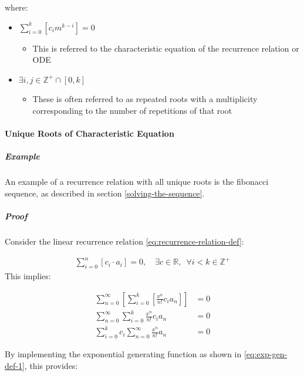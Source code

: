 \documentclass[11pt]{article}
\begin{document}
where:

\begin{itemize}
\item \(\sum^{k}_{i=0}\left[  c_{i}m^{k-i} \right] = 0\)
\begin{itemize}
\item This is referred to the characteristic equation of the recurrence relation or ODE \cite{levinSolvingRecurrenceRelations2018}
\end{itemize}
\item \(\exists i,j \in \mathbb{Z}^{+} \cap \left[0,k\right]\)
\begin{itemize}
\item These is often referred to as repeated roots \cite{levinSolvingRecurrenceRelations2018,zillMatrixExponential2009} with a multiplicity corresponding to the number of repetitions of that root \cite[]{nicodemiIntroductionAbstractAlgebra2007}
\end{itemize}
\end{itemize}

\paragraph{Unique Roots of Characteristic Equation}
\label{uniq-roots-recurrence}
\subparagraph{Example}
\label{sec:org969603a}
An example of a recurrence relation with all unique roots is the fibonacci sequence, as described in section \ref{solving-the-sequence}.
\subparagraph{Proof}
\label{sec:org589c693}
Consider the linear recurrence relation \eqref{eq:recurrence-relation-def}:

\begin{align}
\sum^{n}_{i= 0}   \left[ c_i \cdot  a_i \right] = 0, \quad \exists c \in
\mathbb{R}, \enspace \forall i<k\in\mathbb{Z}^+ \nonumber \label{eq:recurrence-relation-def}
\end{align}
This implies:


\begin{align}
    \sum^{\infty}_{n= 0}   \left[ \sum^{k}_{i= 0}   \left[ \frac{x^n}{n!} c_i a_n \right]  \right]  &= 0 \\
    \sum^{\infty}_{n= 0}    \sum^{k}_{i= 0}    \frac{x^n}{n!} c_i a_n    &= 0 \\
        \sum^{k}_{i= 0} c_i \sum^{\infty}_{n= 0}    \frac{x^n}{n!}  a_n    &= 0
\end{align}

By implementing the exponential generating function as shown in
\eqref{eq:exp-gen-def-1}, this provides:
\end{document}
